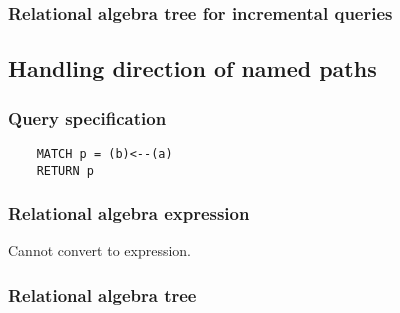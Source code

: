 
	\subsubsection*{Relational algebra tree for incremental queries}

	\subsection{Handling direction of named paths}

	\subsubsection*{Query specification}

	\begin{lstlisting}
	MATCH p = (b)<--(a)
	RETURN p
	\end{lstlisting}


	\subsubsection*{Relational algebra expression}

	Cannot convert to expression.

	\subsubsection*{Relational algebra tree}

